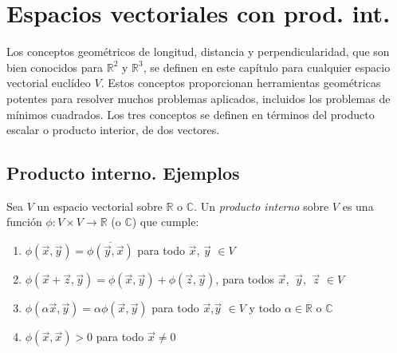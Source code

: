 \chapter{Espacios vectoriales con prod. int.}
Los conceptos geométricos de longitud, distancia y perpendicularidad, que son bien conocidos para   $\mathbb{R}^2$ y $\mathbb{R}^3$, se definen en este capítulo  para cualquier espacio vectorial euclídeo $V$. Estos conceptos  proporcionan herramientas geométricas potentes para resolver muchos problemas aplicados, incluidos los problemas de mínimos cuadrados. Los tres conceptos se definen en términos del  producto escalar o  producto interior, de dos vectores.

\section{Producto interno. Ejemplos}


\bigskip

\begin{definition} 
\label{Prod.int.}
\bigskip

Sea $V$ un espacio vectorial sobre $\mathbb{R}$ o $\mathbb{C}$. Un \textit{producto interno} sobre $V$ es una función $\phi :  V \times V\rightarrow \mathbb{R}$ (o $\mathbb{C}$) que cumple:

\bigskip


\begin{enumerate}

\item   $\phi(\vec{x},\vec{y})=\overline{\phi(\vec{y},\vec{x})} $  para todo $\vec{x}$, $ \vec{y}$ $\in V$

\bigskip


\item  

$\phi(\vec{x}+\vec{z},\vec{y}   )=\phi(\vec{x},\vec{y}) + \phi(\vec{z},\vec{y})$, para todos  $ \vec{x}$, $ ~\vec{y}$, $ ~\vec{z} $ $\in V$

\bigskip


\item $\phi(\alpha\vec{x},\vec{y})=\alpha\phi(\vec{x},\vec{y})$ para todo $\vec{x}$,$\vec{y}$ $\in V$ y todo $\alpha \in \mathbb{R} $ o $\mathbb{C}$

\bigskip

\item  $\phi(\vec{x},\vec{x})> 0$ para todo $\vec{x}\neq 0$

\end{enumerate}
\end{definition}

